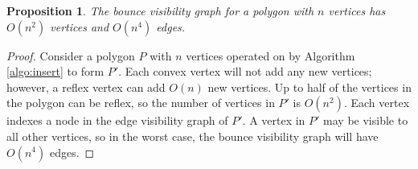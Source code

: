 \documentclass[]{article}
\newtheorem{proposition}{Proposition}
\begin{document}
%
%
%



\begin{proposition} \label{prop:complexity}
The bounce visibility graph for a polygon with $n$ vertices has 
$O(n^2)$ vertices and $O(n^4)$ edges.
\end{proposition}

\begin{proof}

Consider a polygon $P$ with $n$ vertices operated on by Algorithm
\ref{algo:insert} to form $P'$. Each convex vertex will not add any new vertices; however, 
a reflex vertex can add $O(n)$ new vertices. Up to half of the vertices in the polygon 
can be reflex, so the number of vertices in $P'$ is $O(n^2)$. 
Each vertex indexes a node in the edge visibility graph of $P'$. A vertex 
in $P'$ may be visible to all other vertices, so in the worst
case, the bounce visibility graph will have $O(n^4)$ edges.

\end{proof}
\end{document}
